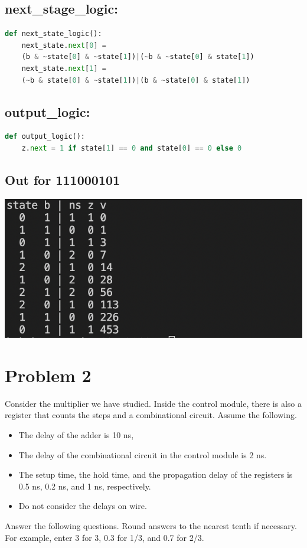 \documentclass{article}
\begin{document}
\subsection*{next\_stage\_logic:}
\begin{lstlisting}[language=Python]
def next_state_logic():
    next_state.next[0] = 
    (b & ~state[0] & ~state[1])|(~b & ~state[0] & state[1])
    next_state.next[1] = 
    (~b & state[0] & ~state[1])|(b & ~state[0] & state[1])
\end{lstlisting}

\subsection*{output\_logic:}
\begin{lstlisting}[language=Python]
def output_logic():
    z.next = 1 if state[1] == 0 and state[0] == 0 else 0
\end{lstlisting}

\subsection*{Out for 111000101}
\includegraphics[scale=1]{images/Q1Out.png}

\section*{Problem 2}

Consider the multiplier we have studied. Inside the control module, there is also a register
that counts the steps and a combinational circuit. Assume the following. 
\begin{itemize}
    \item The delay of the adder is 10 ns, 
    \item The delay of the combinational circuit in the control module is 2 ns. 
    \item The setup time, the hold time, and the propagation delay of the registers is 0.5 ns, 0.2 ns,
    and 1 ns, respectively. 
    \item Do not consider the delays on wire.
\end{itemize}
Answer the following questions. Round answers to the nearest tenth if necessary. For
example, enter 3 for 3, 0.3 for 1/3, and 0.7 for 2/3. 
\end{document}
